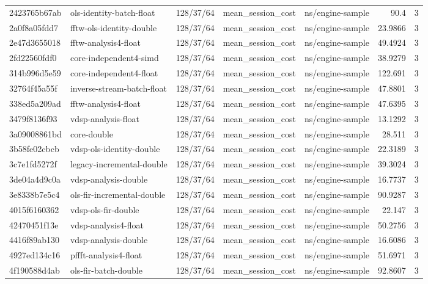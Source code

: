 \begin{longtable}{lllllrr}
2423765b67ab & ols-identity-batch-float & 128/37/64 & mean\_session\_cost & ns/engine-sample & 90.4 & 3 \\
2a0f8a05fdd7 & fftw-ols-identity-double & 128/37/64 & mean\_session\_cost & ns/engine-sample & 23.9866 & 3 \\
2e47d3655018 & fftw-analysis4-float & 128/37/64 & mean\_session\_cost & ns/engine-sample & 49.4924 & 3 \\
2fd22560fdf0 & core-independent4-simd & 128/37/64 & mean\_session\_cost & ns/engine-sample & 38.9279 & 3 \\
314b996d5e59 & core-independent4-float & 128/37/64 & mean\_session\_cost & ns/engine-sample & 122.691 & 3 \\
32764f45a55f & inverse-stream-batch-float & 128/37/64 & mean\_session\_cost & ns/engine-sample & 47.8801 & 3 \\
338ed5a209ad & fftw-analysis4-float & 128/37/64 & mean\_session\_cost & ns/engine-sample & 47.6395 & 3 \\
3479f8136f93 & vdsp-analysis-float & 128/37/64 & mean\_session\_cost & ns/engine-sample & 13.1292 & 3 \\
3a09008861bd & core-double & 128/37/64 & mean\_session\_cost & ns/engine-sample & 28.511 & 3 \\
3b58fe02cbcb & vdsp-ols-identity-double & 128/37/64 & mean\_session\_cost & ns/engine-sample & 22.3189 & 3 \\
3c7e1fd5272f & legacy-incremental-double & 128/37/64 & mean\_session\_cost & ns/engine-sample & 39.3024 & 3 \\
3de04a4d9c0a & vdsp-analysis-double & 128/37/64 & mean\_session\_cost & ns/engine-sample & 16.7737 & 3 \\
3e8338b7e5c4 & ols-fir-incremental-double & 128/37/64 & mean\_session\_cost & ns/engine-sample & 90.9287 & 3 \\
4015f6160362 & vdsp-ols-fir-double & 128/37/64 & mean\_session\_cost & ns/engine-sample & 22.147 & 3 \\
42470451f13e & vdsp-analysis4-float & 128/37/64 & mean\_session\_cost & ns/engine-sample & 50.2756 & 3 \\
4416f89ab130 & vdsp-analysis-double & 128/37/64 & mean\_session\_cost & ns/engine-sample & 16.6086 & 3 \\
4927ed134c16 & pffft-analysis4-float & 128/37/64 & mean\_session\_cost & ns/engine-sample & 51.6971 & 3 \\
4f190588d4ab & ols-fir-batch-double & 128/37/64 & mean\_session\_cost & ns/engine-sample & 92.8607 & 3 \\

\end{longtable}
